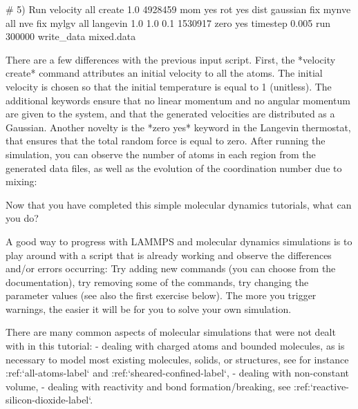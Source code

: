 \begin{lcverbatim}
# 5) Run
velocity all create 1.0 4928459 mom yes rot yes dist gaussian
fix mynve all nve
fix mylgv all langevin 1.0 1.0 0.1 1530917 zero yes
timestep 0.005
run 300000
write_data mixed.data
\end{lcverbatim}

There are a few differences with the
previous input script. First, the *velocity create*
command attributes an initial velocity to all the atoms.
The initial velocity is chosen so that the initial
temperature is equal to 1 (unitless). The additional
keywords ensure that no linear momentum and no angular
momentum are given to the system, and that the generated
velocities are distributed as a Gaussian. Another novelty
is the *zero yes* keyword in the Langevin thermostat, that
ensures that the total random force is equal to zero.
After running the simulation, you can observe the number
of atoms in each region from the generated data files, as
well as the evolution of the coordination number due to
mixing:












Now that you have completed this simple molecular dynamics tutorials, what can you do?






A good way to progress with LAMMPS and molecular dynamics
simulations is to play around with a script that is already
working and observe the differences and/or errors occurring:
Try adding new commands (you can choose from the documentation),
try removing some of the commands, try changing the parameter values
(see also the first exercise below).
The more you trigger warnings, the easier it will be for you to solve your
own simulation.






There are many common aspects of molecular simulations that were not dealt with in this
tutorial:
- dealing with charged atoms and bounded molecules, as is necessary to model most existing molecules, solids, or structures, see for instance :ref:`all-atoms-label` and :ref:`sheared-confined-label`,
- dealing with non-constant volume,
- dealing with reactivity and bond formation/breaking, see :ref:`reactive-silicon-dioxide-label`.












